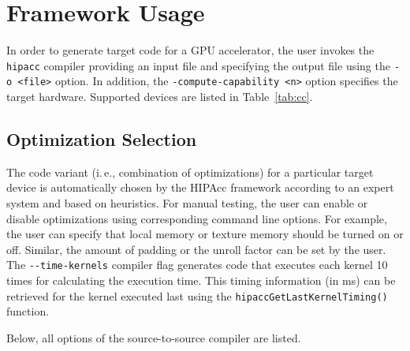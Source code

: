 \section{Framework Usage}
In order to generate target code for a \ac{GPU} accelerator, the user invokes the \verb|hipacc| compiler providing an input file and specifying the output file using the \verb|-o <file>| option.
In addition, the \verb|-compute-capability <n>| option specifies the target hardware. Supported devices are listed in Table~\ref{tab:cc}.

\subsection{Optimization Selection}
The code variant (i.\,e., combination of optimizations) for a particular target device is automatically chosen by the \ac{HIPAcc} framework according to an expert system and based on heuristics.
For manual testing, the user can enable or disable optimizations using corresponding command line options.
For example, the user can specify that local memory or texture memory should be turned on or off.
Similar, the amount of padding or the unroll factor can be set by the user.
The \verb|--time-kernels| compiler flag generates code that executes each kernel 10 times for calculating the execution time.
This timing information (in ms) can be retrieved for the kernel executed last using the \verb|hipaccGetLastKernelTiming()| function.

Below, all options of the source-to-source compiler are listed.

